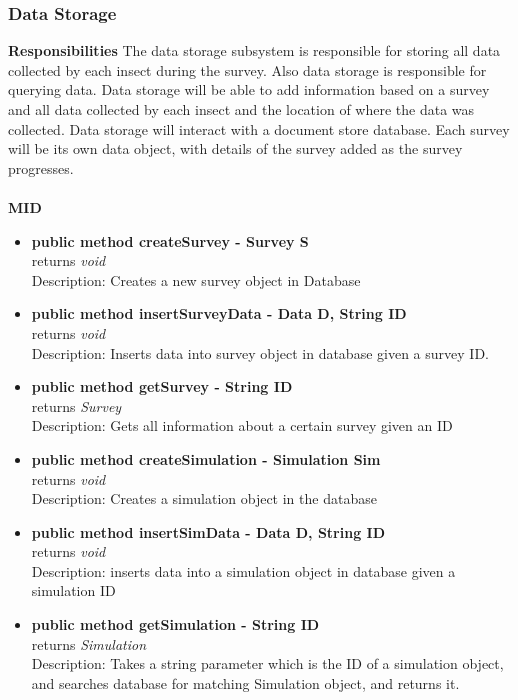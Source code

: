 \documentclass[11pt]{article}
\begin{document}
\subsubsection{Data Storage}
\textbf{Responsibilities}
The data storage subsystem is responsible for storing all data collected by each insect during the survey. Also data storage is responsible for querying data. Data storage will be able to add information based on a survey and all data collected by each insect and the location of where the data was collected. Data storage will interact with a document store database. Each survey will be its own data object, with details of the survey added as the survey progresses.
\\\\
\textbf{MID}
\begin{itemize}
    \item \textbf{public method createSurvey - Survey S} \\
    returns \textit{void} \\
    Description: Creates a new survey object in Database
    \item \textbf{public method insertSurveyData - Data D, String ID} \\
    returns \textit{void} \\ 
    Description: Inserts data into survey object in database given a survey ID.
    \item \textbf{public method getSurvey - String ID } \\
    returns \textit{Survey} \\
    Description: Gets all information about a certain survey given an ID
    \item \textbf{ public method  createSimulation - Simulation Sim} \\
    returns \textit{void} \\
    Description: Creates a simulation object in the database
    \item \textbf{public method insertSimData - Data D, String ID} \\
    returns \textit{void} \\
    Description: inserts data into a simulation object in database given a simulation ID
    \item \textbf{public method getSimulation - String ID} \\
    returns \textit{Simulation} \\
    Description: Takes a string parameter which is the ID of a simulation object, and searches database for matching Simulation object, and returns it.
\end{itemize}
\end{document}
